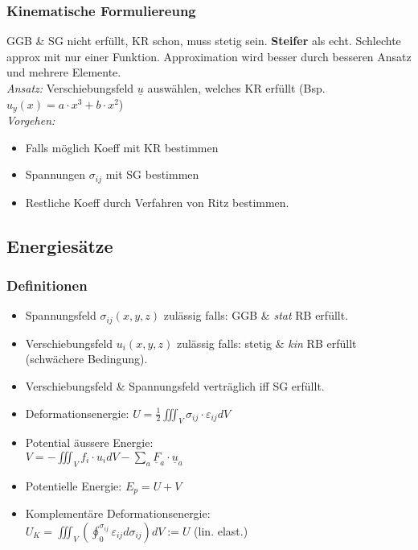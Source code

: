         \subsubsection{Kinematische Formuliereung}
            GGB \& SG nicht erfüllt, KR schon, muss stetig sein. \textbf{Steifer} als echt. Schlechte approx mit nur einer Funktion. Approximation wird besser durch besseren Ansatz und mehrere Elemente.
            \\\textit{Ansatz:} Verschiebungsfeld $\underline{u}$ auswählen, welches KR erfüllt (Bsp. $u_y(x) = a\cdot x^3+b\cdot x^2$)
            \\\textit{Vorgehen:}
            \vspace{-2mm}
            \begin{itemize}
                \item Falls möglich Koeff mit KR bestimmen
                \item Spannungen $\sigma_{ij}$ mit SG bestimmen
                \item Restliche Koeff durch Verfahren von Ritz bestimmen.
            \end{itemize}
            \vspace{1mm}
            
    \subsection{Energiesätze}
        \subsubsection{Definitionen}
            \begin{itemize}
                \item Spannungsfeld $\sigma_{ij}(x,y,z)$ zulässig falls: GGB \& \textit{stat} RB erfüllt.
                \item Verschiebungsfeld $u_i(x,y,z)$ zulässig falls: stetig \& \textit{kin} RB erfüllt (schwächere Bedingung).
                \item Verschiebungsfeld \& Spannungsfeld verträglich iff SG erfüllt.
                \item Deformationsenergie: $U=\frac{1}{2}\iiint_V \sigma_{ij}\cdot\varepsilon_{ij}dV$
                \item Potential äussere Energie:\\
                $V=-\iiint_V f_i\cdot u_idV-\sum_{a}\underline{F}_a\cdot\underline{u}_a$
                \item Potentielle Energie: $E_p=U+V$
                \item Komplementäre Deformationsenergie:\\ $U_K=\iiint_V(\oint_0^{\sigma_{ij}}\varepsilon_{ij}d\sigma_{ij})dV := U$  (lin. elast.)
            \end{itemize}
        \vspace{2mm}
